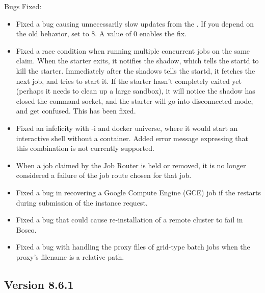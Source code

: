 \noindent Bugs Fixed:

\begin{itemize}

\item Fixed a bug causing unnecessarily slow updates from the .
If you depend on the old behavior, set  to 8.  A
value of 0 enables the fix.

\item Fixed a race condition when running multiple concurrent jobs on the same claim.
When the starter exits, it notifies the shadow, which tells the startd to kill the starter.
Immediately after the shadows tells the startd, it fetches the next job, and tries to start it.
If the starter hasn't completely exited yet (perhaps it needs to clean up a large sandbox),
it will notice the shadow has closed the command socket, and the starter will go into disconnected
mode, and get confused.  This has been fixed.

\item Fixed an infelicity with  -i and docker universe,
where it would start an interactive shell without a container.  Added error
message expressing that this combination is not currently supported.

\item When a job claimed by the Job Router is held or removed, it is no
longer considered a failure of the job route chosen for that job.

\item Fixed a bug in recovering a Google Compute Engine (GCE) job if the
 restarts during submission of the instance request.

\item Fixed a bug that could cause re-installation of a remote cluster
to fail in Bosco.

\item Fixed a bug with handling the proxy files of grid-type batch jobs
when the proxy's filename is a relative path.

\end{itemize}

\subsection*{\label{sec:New-8-6-1}Version 8.6.1}

